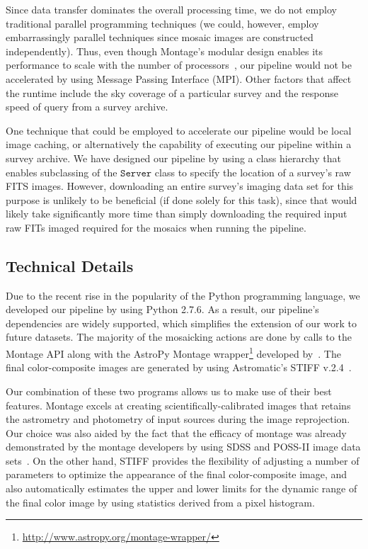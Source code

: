 \documentclass[authoryear, 12pt, 5p, times]{elsarticle}
\begin{document}
Since data transfer dominates the overall processing time, we do not employ traditional parallel programming techniques (we could, however, employ embarrassingly parallel techniques since mosaic images are constructed independently). Thus, even though Montage's modular design enables its performance to scale with the number of processors~\citep{montage}, our pipeline would not be accelerated by using  Message Passing Interface (MPI).  Other factors that affect the runtime include the sky coverage of a particular survey and the response speed of query from a survey archive.

One technique that could be employed to accelerate our pipeline would be local image caching, or alternatively the capability of executing our pipeline within a survey archive. We have designed our pipeline by using a class hierarchy that enables subclassing of the $\texttt{Server}$ class to specify the location of a survey's raw FITS images. However, downloading an entire survey's imaging data set for this purpose is unlikely to be beneficial (if done solely for this task), since that would likely take significantly more time than simply downloading the required input raw FITs imaged required for the mosaics when running the pipeline.

\subsection{Technical Details}

Due to the recent rise in the popularity of the Python programming language, we developed our pipeline by using Python 2.7.6. As a result, our pipeline's dependencies are widely supported, which simplifies the extension of our work to future datasets. The majority of the mosaicking actions are done by calls to the Montage API along with the AstroPy Montage wrapper\footnote{\url{http://www.astropy.org/montage-wrapper/}} developed by~\cite{montpy}. The final color-composite images are generated by using Astromatic's STIFF v.2.4~\citep{stiff}. 

Our combination of these two programs allows us to make use of their best features. Montage excels at creating scientifically-calibrated images that retains the astrometry and photometry of input sources during the image reprojection. Our choice was also aided by the fact that the efficacy of montage was already demonstrated by the montage developers by using SDSS and POSS-II image data sets~\citep{montage}. On the other hand, STIFF provides the flexibility of adjusting a number of parameters to optimize the appearance of the final color-composite image, and also automatically estimates the upper and lower limits for the dynamic range of the final color image by using statistics derived from a pixel histogram. 
\end{document}
